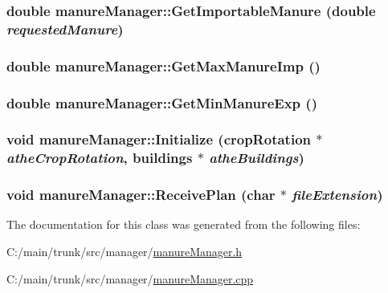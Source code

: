 \hypertarget{classmanure_manager_ad1f560ee2b8ad735c93d70f90ed98fa4}{
\subsubsection[{GetImportableManure}]{\setlength{\rightskip}{0pt plus 5cm}double manureManager::GetImportableManure (double {\em requestedManure})}}
\label{classmanure_manager_ad1f560ee2b8ad735c93d70f90ed98fa4}
\hypertarget{classmanure_manager_a79ff84694eceabe97df0105a41455b60}{
\subsubsection[{GetMaxManureImp}]{\setlength{\rightskip}{0pt plus 5cm}double manureManager::GetMaxManureImp ()}}
\label{classmanure_manager_a79ff84694eceabe97df0105a41455b60}
\hypertarget{classmanure_manager_aa99cc8ffe94eb2c89f9157565b5edcec}{
\subsubsection[{GetMinManureExp}]{\setlength{\rightskip}{0pt plus 5cm}double manureManager::GetMinManureExp ()}}
\label{classmanure_manager_aa99cc8ffe94eb2c89f9157565b5edcec}
\hypertarget{classmanure_manager_addbf8803c17d373bf79d7cdc349f8733}{
\subsubsection[{Initialize}]{\setlength{\rightskip}{0pt plus 5cm}void manureManager::Initialize ({\bf cropRotation} $\ast$ {\em atheCropRotation}, \/  {\bf buildings} $\ast$ {\em atheBuildings})}}
\label{classmanure_manager_addbf8803c17d373bf79d7cdc349f8733}
\hypertarget{classmanure_manager_a500261bdfd91ae83071889cc072ac069}{
\subsubsection[{ReceivePlan}]{\setlength{\rightskip}{0pt plus 5cm}void manureManager::ReceivePlan (char $\ast$ {\em fileExtension})}}
\label{classmanure_manager_a500261bdfd91ae83071889cc072ac069}


The documentation for this class was generated from the following files:\begin{DoxyCompactItemize}
\item 
C:/main/trunk/src/manager/\hyperlink{manure_manager_8h}{manureManager.h}\item 
C:/main/trunk/src/manager/\hyperlink{manure_manager_8cpp}{manureManager.cpp}\end{DoxyCompactItemize}
